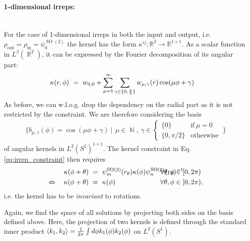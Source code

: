 \documentclass{article}
\DeclareMathOperator*{\R}{\mathbb{R}}
\DeclareMathOperator*{\N}{\mathbb{N}}
\newcommand{\SO}[1]{\ensuremath{\operatorname{SO}(#1)}}
\begin{document}
\paragraph{1-dimensional irreps:}~\\[.75ex]
For the case of 1-dimensional irreps in both the input and output, i.e. $\rho_\text{out} = \rho_\text{in} = \psi_0^{\SO2}$ the kernel has the form $\kappa^{ij}: \mathbb{R}^2 \to \mathbb{R}^{1\times1}$.
As a scalar function in $L^2(\R^2)$, it can be expressed by the Fourier decomposition of its angular part:
\begin{align*}
\kappa(r, \phi)\ &=\ w_{0,0} + \sum_{\mu=1}^{\infty} \sum_{\gamma \in \{0, {\pi\over2}\}} w_{\mu, \gamma}(r) \cos(\mu\phi + \gamma)
\end{align*}
As before, we can w.l.o.g. drop the dependency on the radial part as it is not restricted by the constraint.
We are therefore considering the basis
\begin{align}\label{eq:so2_1x1_starting_basis}
\Bigg\{ b_{\mu,\gamma}(\phi) = \cos(\mu\phi +\gamma) \ \Bigg|\ \ \mu \in \N,\ \gamma \in 
		\begin{cases}
			\{0\}		 &\!\!\text{if}\ \mu=0 \\[-1pt]
			\{0, \pi/2\} &\!\!\text{otherwise}
		\end{cases}
		\ 
	\Bigg\}
\end{align}
of angular kernels in $L^2(S^1)^{1\times1}$.
The kernel constraint in Eq. \eqref{eq:irrep_constraint} then requires
\begin{align*}
	\kappa(\phi + \theta)\ &=\ \psi_m^{\SO2}(r_\theta)\kappa(\phi) \psi_n^{\SO2}(r_\theta)^{-1} \mkern-80mu&\forall\theta,\phi\in[0,2\pi)&\\
	\Leftrightarrow\quad
	\kappa(\phi + \theta)\ &=\ \kappa(\phi) \mkern-80mu&\forall\theta,\phi\in[0,2\pi)&,
\end{align*}
i.e. the kernel has to be \textit{invariant} to rotations.

Again, we find the space of all solutions by projecting both sides on the basis defined above.
Here, the projection of two kernels is defined through the standard inner product $\langle k_1, k_2\rangle = {1\over2\pi}\int d\phi k_1(\phi) k_2(\phi)$ on $L^2(S^1)$.
\end{document}
